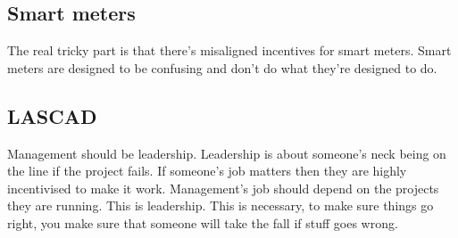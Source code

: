 \documentclass[10pt, a4paper]{article}
\begin{document}
\subsection{Smart meters}

The real tricky part is that there's misaligned incentives for smart meters. Smart meters
are designed to be confusing and don't do what they're designed to do.

\subsection{LASCAD}

Management should be leadership.
Leadership is about someone's neck being on the line if the project fails. If someone's job matters
then they are highly incentivised to make it work. Management's job should depend on the projects they are running.
This is leadership. This is necessary, to make sure things go right, you make sure that someone will take the fall if
stuff goes wrong.
\end{document}
